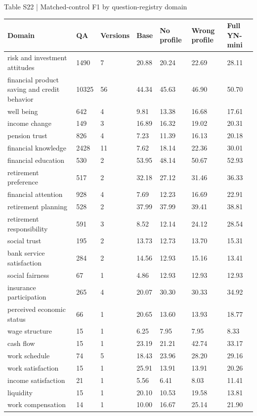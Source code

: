 \documentclass[10pt]{article}
\begin{document}
\begin{center}
\begin{minipage}{\textwidth}
\fontsize{8.5}{10.3}\selectfont
Table S22 | Matched-control F1 by question-registry domain
\par\vspace{4pt}
\begin{tabularx}{\textwidth}{@{}XXXXXXX@{}}
\toprule
Domain & QA & Versions & Base & No profile & Wrong profile & Full YN-mini \\
\midrule
risk and investment attitudes & 1490 & 7 & 20.88 & 20.24 & 22.69 & 28.11 \\
financial product saving and credit behavior & 10325 & 56 & 44.34 & 45.63 & 46.90 & 50.70 \\
well being & 642 & 4 & 9.81 & 13.38 & 16.68 & 17.61 \\
income change & 149 & 3 & 16.89 & 16.32 & 19.02 & 20.31 \\
pension trust & 826 & 4 & 7.23 & 11.39 & 16.13 & 20.18 \\
financial knowledge & 2428 & 11 & 7.62 & 18.14 & 22.36 & 30.01 \\
financial education & 530 & 2 & 53.95 & 48.14 & 50.67 & 52.93 \\
retirement preference & 517 & 2 & 32.18 & 27.12 & 31.46 & 36.33 \\
financial attention & 928 & 4 & 7.69 & 12.23 & 16.69 & 22.91 \\
retirement planning & 528 & 2 & 37.99 & 37.99 & 39.41 & 38.81 \\
retirement responsibility & 591 & 3 & 8.52 & 12.14 & 24.12 & 28.54 \\
social trust & 195 & 2 & 13.73 & 12.73 & 13.70 & 15.31 \\
bank service satisfaction & 284 & 2 & 14.56 & 12.93 & 15.16 & 13.41 \\
social fairness & 67 & 1 & 4.86 & 12.93 & 12.93 & 12.93 \\
insurance participation & 265 & 4 & 20.07 & 30.30 & 30.33 & 34.92 \\
perceived economic status & 66 & 1 & 20.65 & 13.60 & 13.93 & 18.77 \\
wage structure & 15 & 1 & 6.25 & 7.95 & 7.95 & 8.33 \\
cash flow & 15 & 1 & 23.19 & 21.21 & 42.74 & 33.17 \\
work schedule & 74 & 5 & 18.43 & 23.96 & 28.20 & 29.16 \\
work satisfaction & 15 & 1 & 25.91 & 13.91 & 13.91 & 20.26 \\
income satisfaction & 21 & 1 & 5.56 & 6.41 & 8.03 & 11.41 \\
liquidity & 15 & 1 & 20.10 & 10.53 & 19.58 & 13.81 \\
work compensation & 14 & 1 & 10.00 & 16.67 & 25.14 & 21.90 \\
\bottomrule
\end{tabularx}
\par{}
\end{minipage}
\end{center}
\end{document}
